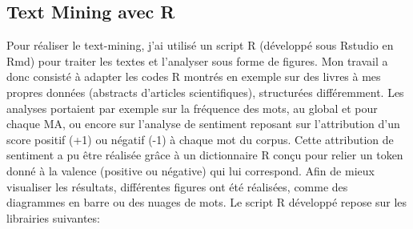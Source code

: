 \documentclass{book}
\begin{document}
\subsection{Text Mining avec R}
\noindent
Pour réaliser le text-mining, j'ai utilisé un script R (développé sous Rstudio
en Rmd) pour traiter les textes et l'analyser sous forme de figures. Mon travail a donc consisté à adapter les
codes R montrés en exemple sur des livres à mes propres données (abstracts
d'articles scientifiques), structurées différemment. Les analyses portaient par
exemple sur la fréquence des mots, au global et pour chaque MA, ou encore sur
l'analyse de sentiment reposant sur l'attribution d'un
score positif (+1) ou négatif (-1) à chaque mot du corpus. Cette attribution de
sentiment a pu être réalisée grâce à un dictionnaire R conçu pour relier un
token donné à la valence (positive ou négative) qui lui correspond. Afin de
mieux visualiser les résultats, différentes figures ont été réalisées, comme
des diagrammes en barre ou des nuages de mots. Le script R développé repose sur les librairies suivantes:
\end{document}
